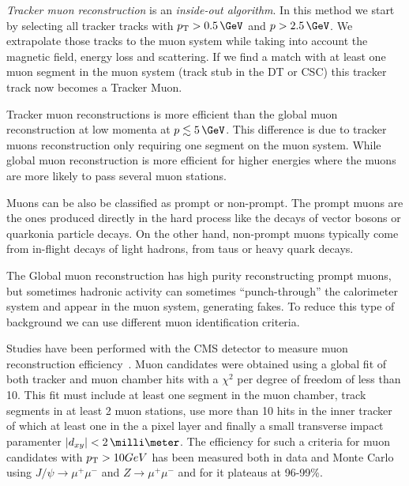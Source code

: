 \textit{Tracker muon reconstruction} is an \textit{inside-out algorithm}. In this method we start by selecting all tracker tracks with $\pt>0.5\,\GeV$ and $p>2.5\,\GeV$. We extrapolate those tracks to the muon system while taking into account the magnetic field, energy loss and scattering. If we find a match with at least one muon segment in the muon system (track stub in the \gls{DT} or \gls{CSC}) this tracker track now becomes a Tracker Muon. 

Tracker muon reconstructions is more efficient than the global muon reconstruction at low momenta at $p\lesssim 5\,\GeV$. This difference is due to tracker muons reconstruction only requiring one segment on the muon system. While global muon reconstruction is more efficient for higher energies where the muons are more likely to pass several muon stations.

Muons can be also be classified as prompt or non-prompt. The prompt muons are the ones produced directly in the hard process like the decays of vector bosons or quarkonia particle decays. On the other hand, non-prompt muons typically come from in-flight decays of light hadrons, from taus or heavy quark decays. 

The Global muon reconstruction has high purity reconstructing prompt muons, but sometimes hadronic activity can sometimes ``punch-through'' the calorimeter system and appear in the muon system, generating fakes. To reduce this type of background we can use different muon identification criteria.

Studies have been performed with the \gls{CMS} detector to measure muon reconstruction efficiency~\cite{ARTICLE:CMSMuonReconstruction7TeV}. Muon candidates were obtained using a global fit of both tracker and muon chamber hits with a $\chi^2$ per degree of freedom of less than 10. This fit must include at least one segment in the muon chamber, track segments in at least 2 muon stations, use more than 10 hits in the inner tracker of which at least one in the a pixel layer and finally a small transverse impact paramenter $|d_{xy}|< 2\,\milli\meter$. The efficiency for such a criteria for muon candidates with $p_{\mathrm{T}}>10\\GeV$ has been measured both in data and Monte Carlo using $J/\psi \rightarrow \mu^+ \mu^-$ and $Z \rightarrow \mu^+ \mu^-$ and for it plateaus at 96-99\%.

